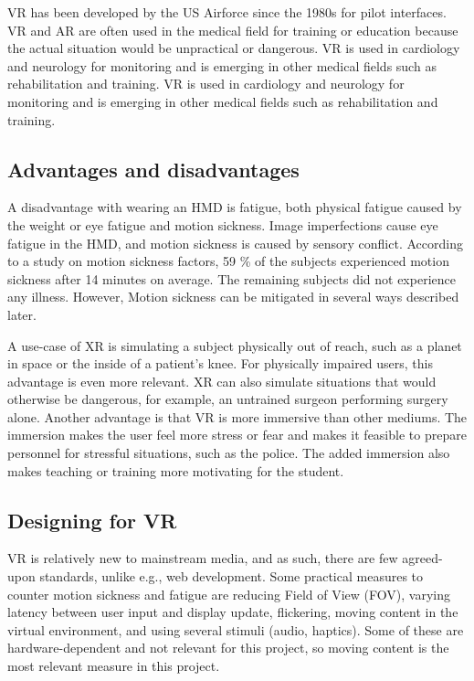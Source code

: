 \documentclass[a4paper]{report}
\begin{document}
VR has been developed by the US Airforce since the 1980s for pilot interfaces\cite{mertz_virtual_2019}. VR and AR are often used in the medical field for training or education because the actual situation would be unpractical or dangerous\cite{freina_immersive_2015}.
VR is used in cardiology and neurology for monitoring and is emerging in other medical fields such as rehabilitation and training\cite{javaid_virtual_2020}.
VR is used in cardiology and neurology for monitoring and is emerging in other medical fields such as rehabilitation and training\cite{javaid_virtual_2020}.


\subsection{Advantages and disadvantages}
A disadvantage with wearing an HMD is fatigue, both physical fatigue caused by the weight or eye fatigue and motion sickness\cite{merhi_motion_2007}.
Image imperfections cause eye fatigue in the HMD\cite{kooi_visual_2004}, and motion sickness is caused by sensory conflict.
According to a study on motion sickness factors, 59 \% of the subjects experienced motion sickness after 14 minutes on average. The remaining subjects did not experience any illness\cite{kooi_visual_2004}. However, Motion sickness can be mitigated in several ways described later.


A use-case of XR is simulating a subject physically out of reach, such as a planet in space or the inside of a patient's knee. For physically impaired users, this advantage is even more relevant.
XR can also simulate situations that would otherwise be dangerous, for example, an untrained surgeon performing surgery alone.
Another advantage is that VR is more immersive than other mediums. The immersion makes the user feel more stress or fear and makes it feasible to prepare personnel for stressful situations, such as the police.
The added immersion also makes teaching or training more motivating for the student.\cite{freina_immersive_2015}


\subsection{Designing for VR}
VR is relatively new to mainstream media, and as such, there are few agreed-upon standards, unlike e.g., web development.
Some practical measures to counter motion sickness and fatigue are reducing Field of View (FOV), varying latency between user input and display update, flickering, moving content in the virtual environment, and using several stimuli (audio, haptics)\cite{chang_virtual_2020}. 
Some of these are hardware-dependent and not relevant for this project, so moving content is the most relevant measure in this project.
\end{document}
